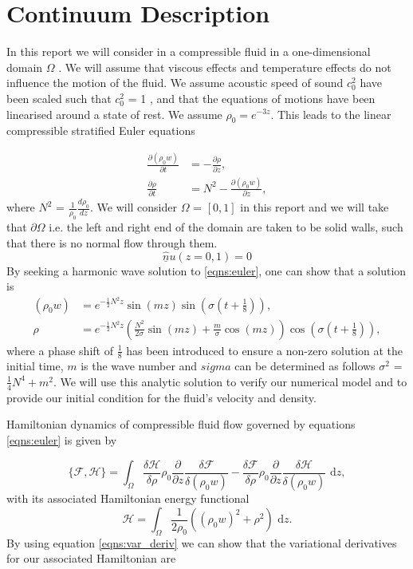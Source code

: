 \documentclass[a4paper,11pt]{article}
\begin{document}
\section{Continuum Description}

In this report we will consider in a compressible fluid in a one-dimensional domain $\Omega$ . We will assume that viscous effects and temperature effects do not influence the motion of the fluid. We assume  acoustic speed of sound $c^2_0$ have been scaled such that  $c^2_0$ = 1  , and that the  equations of motions  have been linearised around a state of rest. We assume $\rho_0 = e^{-3z}$. This leads to the linear compressible stratified Euler equations

\begin{equation}\label{eqns:euler}
\begin{aligned}
\frac{\partial (\rho_0 w) }{\partial t} &= - \frac{\partial \rho }{\partial z},\\
\frac{\partial \rho }{\partial t} &= N^2 -\frac{\partial  (\rho_0 w) }{\partial z},
\end{aligned}
\end{equation}
where $N^2$ = $\frac{1}{\rho_0}\frac{d\rho_0}{dz}$.
We will consider $\Omega$ = $[0,1]$ in this report and we will take that $\partial \Omega$ i.e. the left and right end of the domain are taken to be solid walls, such that there is no normal flow through them. 
\[ \hat{\underline{n}}u(z=0,1) = 0\]
By seeking a harmonic wave solution to \eqref{eqns:euler}, one can show that a solution is 
\begin{equation*}
\begin{aligned}
(\rho_0 w) &= e^{ -\frac{1}{2} N^2 z} \sin(m z )\sin(\sigma(t+\frac{1}{8})),\\
\rho &= e^{ -\frac{1}{2} N^2 z} (\frac{N^2}{2\sigma}\sin (m z) + \frac{m}{\sigma}  \cos(m z)) \cos(\sigma (t + \frac{1}{8})),
\end{aligned}
\end{equation*}
where a phase shift of $\frac{1}{8}$ has been introduced to ensure a non-zero solution at the initial time, $m$ is the wave number and $sigma$ can be determined as follows $\sigma^2$ = $\frac{1}{4}N^4 + m^2$. We will use this analytic solution to verify our numerical model and to provide our initial condition for the fluid's velocity and density.


Hamiltonian dynamics of compressible fluid flow governed by equations \eqref{eqns:euler} is given by

\begin{equation}\label{eqns:pb} \{ \mathcal{F},  \mathcal{H}\} = \int_\Omega \frac{\delta  \mathcal{H}}{\delta \rho}\rho_0 \frac{\partial}{\partial z}\frac{\delta  \mathcal{F}}{\delta (\rho_0 w)} - \frac{\delta  \mathcal{F}}{\delta \rho}\rho_0 \frac{\partial}{\partial z}\frac{\delta  \mathcal{H}}{\delta(\rho_0 w)} \text{ d}z,\end{equation}
with its associated Hamiltonian energy functional
\[  \mathcal{H} = \int_\Omega \frac{1}{2 \rho_0} ( (\rho_0 w)^2 + \rho^2) \text{ d}z.\]
By using equation \eqref{eqns:var_deriv} we can show  that the variational derivatives for our associated Hamiltonian are
\end{document}
